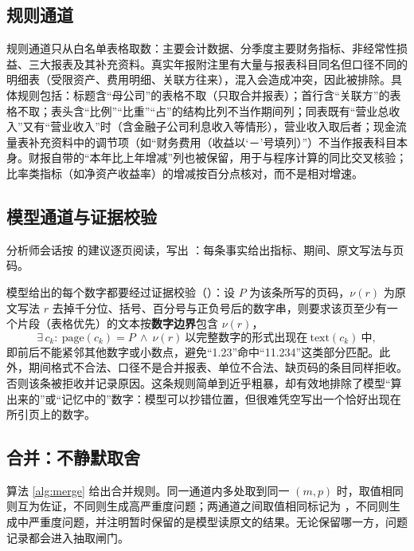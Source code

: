 \subsection{规则通道}
规则通道只从白名单表格取数：主要会计数据、分季度主要财务指标、非经常性损益、三大报表及其补充资料。真实年报附注里有大量与报表科目同名但口径不同的明细表（受限资产、费用明细、关联方往来），混入会造成冲突，因此被排除。具体规则包括：标题含“母公司”的表格不取（只取合并报表）；首行含“关联方”的表格不取；表头含“比例”“比重”“占”的结构比列不当作期间列；同表既有“营业总收入”又有“营业收入”时（含金融子公司利息收入等情形），营业收入取后者；现金流量表补充资料中的调节项（如“财务费用（收益以‘－’号填列）”）不当作报表科目本身。财报自带的“本年比上年增减”列也被保留，用于与程序计算的同比交叉核验；比率类指标（如净资产收益率）的增减按百分点核对，而不是相对增速。

\subsection{模型通道与证据校验}
分析师会话按  的建议逐页阅读，写出 ：每条事实给出指标、期间、原文写法与页码。

模型给出的每个数字都要经过证据校验（）：设 $P$ 为该条所写的页码，$\nu(r)$ 为原文写法 $r$ 去掉千分位、括号、百分号与正负号后的数字串，则要求该页至少有一个片段（表格优先）的文本按\textbf{数字边界}包含 $\nu(r)$，
\begin{equation}
  \exists\, c_k:\ \mathrm{page}(c_k)=P\ \wedge\ \nu(r)\ \text{以完整数字的形式出现在}\ \mathrm{text}(c_k)\ \text{中},
\end{equation}
即前后不能紧邻其他数字或小数点，避免“1.23”命中“11.234”这类部分匹配。此外，期间格式不合法、口径不是合并报表、单位不合法、缺页码的条目同样拒收。否则该条被拒收并记录原因。这条规则简单到近乎粗暴，却有效地排除了模型“算出来的”或“记忆中的”数字：模型可以抄错位置，但很难凭空写出一个恰好出现在所引页上的数字。

\subsection{合并：不静默取舍}
算法 \ref{alg:merge} 给出合并规则。同一通道内多处取到同一 $(m,p)$ 时，取值相同则互为佐证，不同则生成高严重度问题；两通道之间取值相同标记为 ，不同则生成中严重度问题，并注明暂时保留的是模型读原文的结果。无论保留哪一方，问题记录都会进入抽取闸门。

